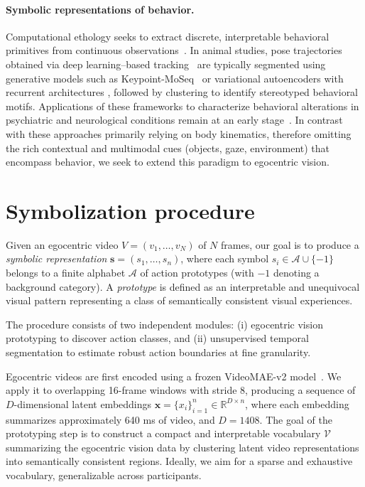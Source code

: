 \documentclass[runningheads]{llncs}
\begin{document}
\paragraph{Symbolic representations of behavior.}
Computational ethology seeks to extract discrete, interpretable behavioral primitives from continuous observations~\cite{FAZZARI2025128330,Datta2019}. In animal studies, pose trajectories obtained via deep learning–based tracking~\cite{Pereira2022,Mathis2018} are typically segmented using generative models such as Keypoint-MoSeq~\cite{Weinreb2024} or variational autoencoders with recurrent architectures \cite{Luxem2022}, followed by clustering to identify stereotyped behavioral motifs. Applications of these frameworks to characterize behavioral alterations in psychiatric and neurological conditions remain at an early stage~\cite{sun2024bd}. In contrast with these approaches primarily relying on body kinematics, therefore omitting the rich contextual and multimodal cues (objects, gaze, environment) that encompass behavior, we seek to extend this paradigm to egocentric vision.
\vspace{-0.2cm}
\section{Symbolization procedure}

Given an egocentric video $V = (v_1, \ldots, v_N)$ of $N$ frames, our goal is to produce a \emph{symbolic representation} $\mathbf{s} = (s_1, \ldots, s_n)$, where each symbol $s_i \in \mathcal{A} \cup \{-1\}$ belongs to a finite alphabet $\mathcal{A}$ of action prototypes (with $-1$ denoting a background category). A \emph{prototype} is defined as an interpretable and unequivocal visual pattern representing a class of semantically consistent visual experiences. 

The procedure consists of two independent modules: (i) egocentric vision prototyping to discover action classes, and (ii) unsupervised temporal segmentation to estimate robust action boundaries at fine granularity. 

Egocentric videos are first encoded using a frozen VideoMAE-v2 model~\cite{wang2023videomaev2}. We apply it to overlapping 16-frame windows with stride 8, producing a sequence of $D$-dimensional latent embeddings $\mathbf{x}=\{x_i\}_{i=1}^{n}\in\mathbb{R}^{D\times n}$, where each embedding summarizes approximately 640 ms of video, and $D=1408$. The goal of the prototyping step is to construct a compact and interpretable vocabulary $\mathcal{V}$ summarizing the egocentric vision data by clustering latent video representations into semantically consistent regions. Ideally, we aim for a sparse and exhaustive vocabulary, generalizable across participants. 
\end{document}
